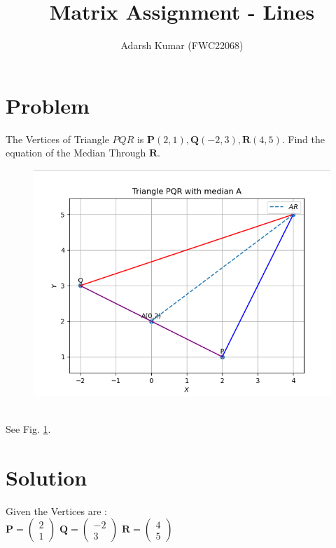 \documentclass[journal,12pt,twocolumn]{IEEEtran}
\title{\mytitle}
\title{
Matrix Assignment - Lines
}
\author{Adarsh Kumar (FWC22068)}
\newcommand{\myvec}[1]{\ensuremath{\begin{pmatrix}#1\end{pmatrix}}}
\let\vec\mathbf
\begin{document}
\maketitle
\tableofcontents
\bigskip


\section{\textbf{Problem}}
\fi
The Vertices of Triangle $PQR$ is $\vec{P}(2,1), \vec{Q}(-2,3), \vec{R}(4,5)$. Find the equation of the Median Through $\vec{R}$.
	\begin{figure}[!ht]
		\centering
 \includegraphics[width=\columnwidth]{chapters/11/10/2/9/figs/line.png}
		\caption{}
		\label{fig:11/10/2/9}
  	\end{figure}
	\\
	\solution See Fig. 
		\ref{fig:11/10/2/9}.
\iffalse


\section{\textbf{Solution}}
Given the Vertices are :\\
\linebreak
$\vec{P} = \myvec{2 \\ 1}$ \hspace{5mm}
$\vec{Q} = \myvec{-2 \\ 3}$ \hspace{5mm}
$\vec{R} = \myvec{4 \\ 5}$ \hspace{5mm}
\linebreak
\end{document}

